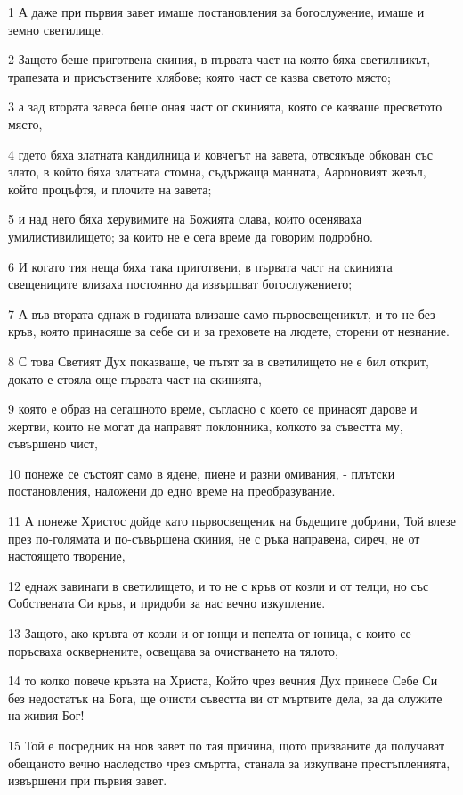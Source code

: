 \par 1 А даже при първия завет имаше постановления за богослужение, имаше и земно светилище.
\par 2 Защото беше приготвена скиния, в първата част на която бяха светилникът, трапезата и присъствените хлябове; която част се казва светото място;
\par 3 а зад втората завеса беше оная част от скинията, която се казваше пресветото място,
\par 4 гдето бяха златната кандилница и ковчегът на завета, отвсякъде обкован със злато, в който бяха златната стомна, съдържаща манната, Аароновият жезъл, който процъфтя, и плочите на завета;
\par 5 и над него бяха херувимите на Божията слава, които осеняваха умилистивилището; за които не е сега време да говорим подробно.
\par 6 И когато тия неща бяха така приготвени, в първата част на скинията свещениците влизаха постоянно да извършват богослужението;
\par 7 А във втората еднаж в годината влизаше само първосвещеникът, и то не без кръв, която принасяше за себе си и за греховете на людете, сторени от незнание.
\par 8 С това Светият Дух показваше, че пътят за в светилището не е бил открит, докато е стояла още първата част на скинията,
\par 9 която е образ на сегашното време, съгласно с което се принасят дарове и жертви, които не могат да направят поклонника, колкото за съвестта му, съвършено чист,
\par 10 понеже се състоят само в ядене, пиене и разни омивания, - плътски постановления, наложени до едно време на преобразувание.
\par 11 А понеже Христос дойде като първосвещеник на бъдещите добрини, Той влезе през по-голямата и по-съвършена скиния, не с ръка направена, сиреч, не от настоящето творение,
\par 12 еднаж завинаги в светилището, и то не с кръв от козли и от телци, но със Собствената Си кръв, и придоби за нас вечно изкупление.
\par 13 Защото, ако кръвта от козли и от юнци и пепелта от юница, с които се поръсваха осквернените, освещава за очистването на тялото,
\par 14 то колко повече кръвта на Христа, Който чрез вечния Дух принесе Себе Си без недостатък на Бога, ще очисти съвестта ви от мъртвите дела, за да служите на живия Бог!
\par 15 Той е посредник на нов завет по тая причина, щото призваните да получават обещаното вечно наследство чрез смъртта, станала за изкупване престъпленията, извършени при първия завет.

